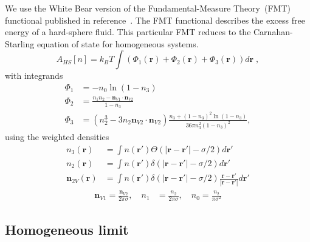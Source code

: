 \documentclass[letterpaper,twocolumn,amsmath,amssymb,jcp,10pt,aip]{revtex4-1}
\newcommand{\rr}{\textbf{r}}
\begin{document}
We use the White Bear version of the Fundamental-Measure Theory~(FMT)
functional published in reference~\cite{roth2002whitebear}.  The FMT
functional describes the excess free energy of a hard-sphere fluid.
This particular FMT reduces to the Carnahan-Starling equation of state
for homogeneous systems.
\begin{equation}
A_\textit{HS}[n] = k_B T \int \left(\Phi_1(\rr) + \Phi_2(\rr) + \Phi_3(\rr)\right) d\rr \; ,
\end{equation}
with integrands
\begin{align}
\Phi_1 &= -n_0 \ln\left( 1 - n_3\right)\\
\Phi_2 &= \frac{n_1 n_2 - \mathbf{n}_{V1} \cdot\mathbf{n}_{V2}}{1-n_3} \\
\Phi_3 &= (n_2^3 - 3 n_2 \mathbf{n}_{V2} \cdot \mathbf{n}_{V2}) \frac{
  n_3 + (1-n_3)^2 \ln(1-n_3)
}{
  36\pi n_3^2\left( 1 - n_3 \right)^2
} ,
\end{align}
using the weighted densities
\begin{align}
  n_3(\rr) &= \int n(\rr') \Theta(\left|\rr - \rr'\right| - \sigma/2) d\rr' \\
  n_2(\rr) &= \int n(\rr') \delta(\left|\rr - \rr'\right| - \sigma/2) d\rr' \\
  \mathbf{n}_{2V}(\rr) &= \int n(\rr') \delta(\left|\rr - \rr'\right| - \sigma/2) \frac{\rr-\rr'}{|\rr-\rr'|}d\rr'
\end{align}
\begin{align}
  \mathbf{n}_{V1} = \frac{\mathbf{n}_{V2}}{2\pi \sigma}, \quad
  n_1 &= \frac{n_2}{2\pi \sigma} , \quad
  n_0 = \frac{n_2}{\pi \sigma^2}
\end{align}


\subsection{Homogeneous limit}
\end{document}
